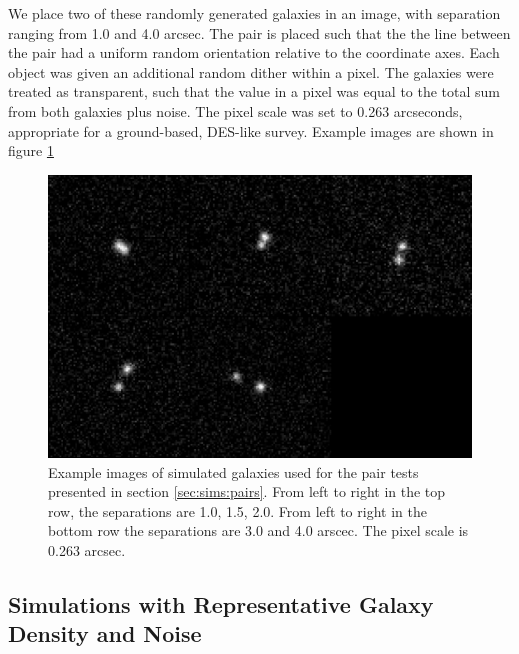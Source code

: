 \documentclass[fleqn,useAMS,usenatbib]{mnras}
\begin{document}
We place two of these randomly generated galaxies in an image, with
separation ranging from 1.0 and 4.0 arcsec. The pair is placed such that the
the line between the pair had a uniform random orientation relative to the
coordinate axes. Each object was given an additional random dither within a
pixel. The galaxies were treated as transparent, such that the value in a
pixel was equal to the total sum from both galaxies plus noise. The pixel scale
was set to 0.263 arcseconds, appropriate for a ground-based, DES-like survey.
Example images are shown in figure \ref{fig:pairs}

\begin{figure}
    \includegraphics[width=\textwidth]{figures/bdk-comb.png}
    \caption{Example images of simulated galaxies used for the pair tests
    presented in section \ref{sec:sims:pairs}.  From left to right in the top row,
    the separations are 1.0, 1.5, 2.0. From left to right in the bottom row the
    separations are 3.0 and 4.0 arscec. The pixel scale is 0.263 arcsec.
    \label{fig:pairs}}
\end{figure}

\subsection{Simulations with Representative Galaxy Density and Noise}
\label{sec:sims:realgals}
\end{document}
